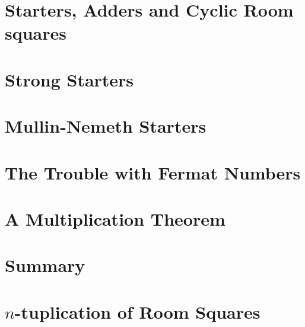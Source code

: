 \documentclass[a4paper, draft]{book}
\begin{document}
\section{Starters, Adders and Cyclic Room squares}
  
\section{Strong Starters}
  \label{sec:strong-starters}
  
\section{Mullin-Nemeth Starters}
  \label{sec:mullin-nemeth}
  
\section{The Trouble with Fermat Numbers}
  \label{sec:trouble-fermat}
  
\section{A Multiplication Theorem}
  
\section{Summary}
  
\section{$n$-tuplication of Room Squares}
  





\backmatter
\printbibliography[title=References]
\end{document}
